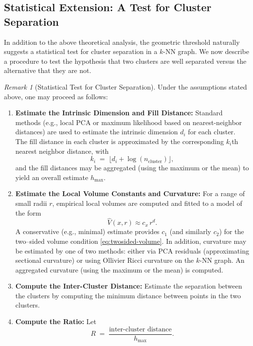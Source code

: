 \documentclass{article}
\theoremstyle{plain}
\theoremstyle{definition}
\theoremstyle{remark}
\newtheorem{remark}[theorem]{Remark}
\begin{document}
\medskip

\subsection{Statistical Extension: A Test for Cluster Separation}

In addition to the above theoretical analysis, the geometric threshold naturally suggests a statistical test for cluster separation in a $k$-NN graph. We now describe a procedure to test the hypothesis that two clusters are well separated versus the alternative that they are not.

\begin{remark}[Statistical Test for Cluster Separation]
Under the assumptions stated above, one may proceed as follows:
\begin{enumerate}
    \item \textbf{Estimate the Intrinsic Dimension and Fill Distance:}  
    Standard methods (e.g., local PCA or maximum likelihood based on nearest-neighbor distances) are used to estimate the intrinsic dimension $d_i$ for each cluster. The fill distance in each cluster is approximated by the corresponding $k_i$th nearest neighbor distance, with
    \[
    k_i \;=\; \lfloor d_i + \log(n_{\text{cluster}}) \rfloor,
    \]
    and the fill distances may be aggregated (using the maximum or the mean) to yield an overall estimate $h_{\max}$.
    
    \item \textbf{Estimate the Local Volume Constants and Curvature:}  
    For a range of small radii $r$, empirical local volumes are computed and fitted to a model of the form
    \[
    \widehat{V}(x,r) \approx c_x\,r^d.
    \]
    A conservative (e.g., minimal) estimate provides $c_1$ (and similarly $c_2$) for the two--sided volume condition \eqref{eq:twosided-volume}. In addition, curvature may be estimated by one of two methods: either via PCA residuals (approximating sectional curvature) or using Ollivier Ricci curvature on the $k$-NN graph. An aggregated curvature (using the maximum or the mean) is computed.
    
    \item \textbf{Compute the Inter-Cluster Distance:}  
    Estimate the separation between the clusters by computing the minimum distance between points in the two clusters.
    
    \item \textbf{Compute the Ratio:}  
    Let 
    \[
    R \;=\; \frac{\text{inter-cluster distance}}{h_{\max}}.
    \]
    

\end{enumerate}
\end{remark}
\end{document}
